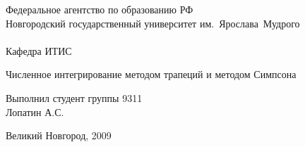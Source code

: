 \begin{titlepage}
\begin{center}

\fontsize{14pt}{18pt}
\selectfont

\vfill
Федеральное агентство по образованию РФ\\
Новгородский государственный университет им.~Ярослава~Мудрого\\
\hrulefill\\
Кафедра ИТИС

\vfill
\vfill

{
\huge
Численное интегрирование\linebreak
методом трапеций и методом Симпсона
}

\vfill

{
\begin{flushright}
Выполнил студент группы 9311\\
Лопатин А.С.
\end{flushright}
}

\vfill

Великий Новгород, 2009
\end{center}
\end{titlepage}

